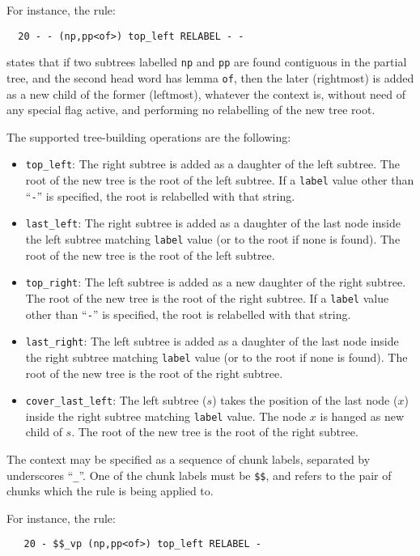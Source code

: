 \documentclass[a4paper]{book}
\begin{document}
  For instance, the rule:
\begin{verbatim}
  20 - - (np,pp<of>) top_left RELABEL - -
\end{verbatim}

  states that if two subtrees labelled \verb#np# and \verb#pp# are
  found contiguous in the partial tree, and the second head word has
  lemma \verb#of#, then the later (rightmost) is added as a new child
  of the former (leftmost), whatever the context is, without need of
  any special flag active, and performing no relabelling of the new
  tree root.

   The supported tree-building operations are the following:
  \begin{itemize}
   \item \verb#top_left#: The right subtree is added as a daughter of
     the left subtree. The root of the new tree is the root of the
     left subtree. If a \verb#label# value other than ``\verb#-#'' is
     specified, the root is relabelled with that string.
   \item \verb#last_left#: The right subtree is added as a daughter of
     the last node inside the left subtree matching \verb#label# value
     (or to the root if none is found). The root of the new tree is
     the root of the left subtree.
   \item \verb#top_right#: The left subtree is added as a new daughter
     of the right subtree. The root of the new tree is the root of the
     right subtree. If a \verb#label# value other than ``\verb#-#'' is
     specified, the root is relabelled with that string.
   \item \verb#last_right#: The left subtree is added as a daughter of
     the last node inside the right subtree matching \verb#label#
     value (or to the root if none is found). The root of the new tree
     is the root of the right subtree.
   \item \verb#cover_last_left#: The left subtree ($s$) takes the
     position of the last node ($x$) inside the right subtree matching
     \verb#label# value. The node $x$ is hanged as new child of $s$.
     The root of the new tree is the root of the right subtree.
  \end{itemize}

  The context may be specified as a sequence of chunk labels,
  separated by underscores ``\verb#_#''.
   One of the chunk labels must be \verb#$$#, and refers to the pair of chunks
  which the rule is being applied to.

  For instance, the rule:
\begin{verbatim}
   20 - $$_vp (np,pp<of>) top_left RELABEL -
\end{verbatim}
\end{document}
